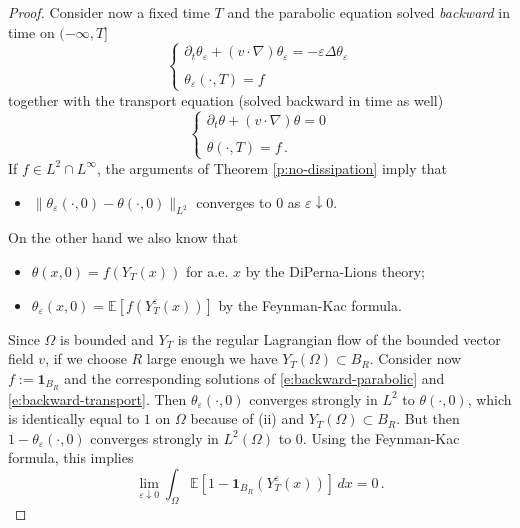 \documentclass[10pt,a4paper]{amsart}
\begin{document}
\begin{proof}
Consider now a fixed time $T$ and the parabolic equation solved {\em backward} in time on $(-\infty, T]$
\begin{equation}\label{e:backward-parabolic}
\left\{
\begin{array}{ll}
\partial_t \theta_\varepsilon + (v\cdot \nabla) \theta_\varepsilon = - \varepsilon \Delta \theta_\varepsilon\\ \\
\theta_\varepsilon (\cdot, T) = f
\end{array}
\right.
\end{equation}
together with the transport equation (solved backward in time as well)
\begin{equation}\label{e:backward-transport}
\left\{
\begin{array}{ll}
\partial_t \theta + (v\cdot \nabla) \theta = 0 \\ \\
\theta (\cdot, T) = f\, .
\end{array}
\right.
\end{equation}
If $f \in L^2\cap L^\infty$, the arguments of Theorem \ref{p:no-dissipation} imply that 
\begin{itemize}
\item[(i)] $\|\theta_\varepsilon (\cdot, 0) - \theta (\cdot, 0)\|_{L^2}$ converges to $0$ as $\varepsilon\downarrow 0$.
\end{itemize}
On the other hand we also know that 
\begin{itemize}
\item[(ii)] $\theta (x,0) = f (Y_T (x))$ for a.e. $x$ by the DiPerna-Lions theory;
\item[(iii)] $\theta_\varepsilon (x,0) = {\mathbb E} [ f (Y_T^\varepsilon (x))]$ by the Feynman-Kac formula. 
\end{itemize}
Since $\Omega$ is bounded and $Y_T$ is the regular Lagrangian flow of the bounded vector field $v$, if we choose $R$ large enough we have $Y_T (\Omega) \subset B_R$. Consider now $f := \mathbf{1}_{B_R}$ and the corresponding solutions of \eqref{e:backward-parabolic} and \eqref{e:backward-transport}. Then $\theta_\varepsilon (\cdot, 0)$ converges strongly in $L^2$ to $\theta (\cdot, 0)$, which is identically equal to $1$ on $\Omega$ because of (ii) and $Y_T (\Omega) \subset B_R$. But then $1-\theta_\varepsilon (\cdot, 0)$ converges strongly in $L^2 (\Omega)$ to $0$. Using the Feynman-Kac formula, this implies
\begin{equation}\label{e:escaping}
\lim_{\varepsilon \downarrow 0} \int_\Omega \mathbb E[1-\mathbf{1}_{B_R} (Y_T^\varepsilon (x))]\, dx = 0\, .

\end{equation}
\end{proof}
\end{document}
